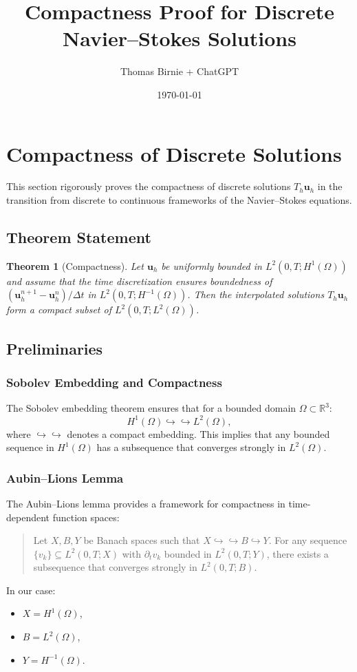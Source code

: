 \documentclass[12pt]{article}
\title{Compactness Proof for Discrete Navier--Stokes Solutions}
\author{Thomas Birnie + ChatGPT}
\date{\today}
\newtheorem{theorem}{Theorem}
\begin{document}
\maketitle

\section{Compactness of Discrete Solutions}

This section rigorously proves the compactness of discrete solutions $T_h \mathbf{u}_h$ in the transition from discrete to continuous frameworks of the Navier--Stokes equations.

\subsection{Theorem Statement}

\begin{theorem}[Compactness]
Let $\mathbf{u}_h$ be uniformly bounded in $L^2(0,T; H^1(\Omega))$ and assume that the time discretization ensures boundedness of $(\mathbf{u}_h^{n+1} - \mathbf{u}_h^n)/\Delta t$ in $L^2(0,T; H^{-1}(\Omega))$. Then the interpolated solutions $T_h \mathbf{u}_h$ form a compact subset of $L^2(0,T; L^2(\Omega))$.
\end{theorem}

\subsection{Preliminaries}

\subsubsection{Sobolev Embedding and Compactness}
The Sobolev embedding theorem ensures that for a bounded domain $\Omega \subset \mathbb{R}^3$:
\begin{equation}
H^1(\Omega) \hookrightarrow\hookrightarrow L^2(\Omega),
\end{equation}
where $\hookrightarrow\hookrightarrow$ denotes a compact embedding. This implies that any bounded sequence in $H^1(\Omega)$ has a subsequence that converges strongly in $L^2(\Omega)$.

\subsubsection{Aubin--Lions Lemma}
The Aubin--Lions lemma provides a framework for compactness in time-dependent function spaces:
\begin{quote}
Let $X, B, Y$ be Banach spaces such that $X \hookrightarrow\hookrightarrow B \hookrightarrow Y$. For any sequence $\{v_k\} \subseteq L^2(0,T; X)$ with $\partial_t v_k$ bounded in $L^2(0,T; Y)$, there exists a subsequence that converges strongly in $L^2(0,T; B)$.
\end{quote}
In our case:
\begin{itemize}
    \item $X = H^1(\Omega)$,
    \item $B = L^2(\Omega)$,
    \item $Y = H^{-1}(\Omega)$.
\end{itemize}
\end{document}

